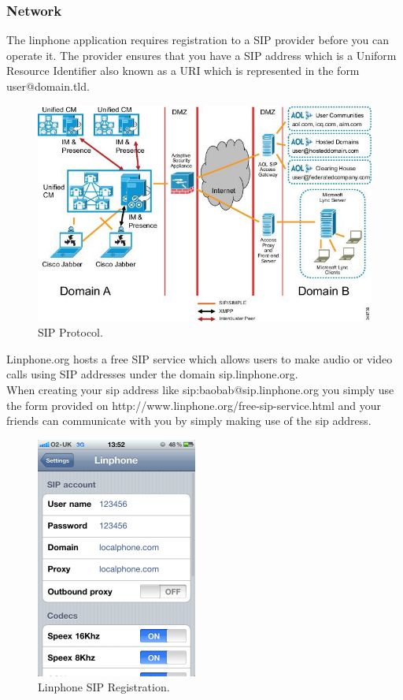 \documentclass[a4paper]{article}
\begin{document}
\subsubsection{Network}
The linphone application requires registration to a SIP provider before you can operate it. The provider ensures that you have a SIP address which is a Uniform Resource Identifier also known as a URI which is represented in the form user@domain.tld. \\


\begin{center}
\begin{figure}[h]
\centering
\includegraphics[width=0.7\linewidth]{./pictures/sip.jpg}
\caption{\label{fig:Agile}SIP Protocol.}
\end{figure}
\end{center}

Linphone.org hosts a free SIP service which allows users to make audio or video calls using SIP addresses under the domain sip.linphone.org. \\
When creating your sip address like sip:baobab@sip.linphone.org you simply use the form provided on http://www.linphone.org/free-sip-service.html and your friends can communicate with you by simply making use of the sip address.


\newpage
\begin{center}
\begin{figure}[h]
\centering
\includegraphics[width=0.4\linewidth]{./pictures/LinphoneSip.jpg}
\caption{\label{fig:Agile}Linphone SIP Registration.}
\end{figure}
\end{center}
\end{document}
